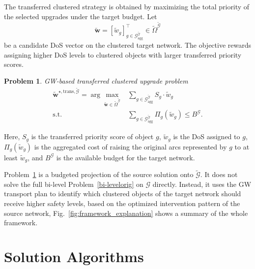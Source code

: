 \documentclass[lettersize,journal]{IEEEtran}
\newtheorem{problem}{Problem}
\begin{document}
The transferred clustered strategy is obtained by maximizing the total priority
of the selected upgrades under the target budget. Let
\[
\tilde{\mathbf{w}}
=
\left[
\tilde{w}_g
\right]_{g\in\mathcal{G}_{\mathrm{agg}}^{\tilde{\mathcal{G}}}}^{\top}
\in
\tilde{\Omega}^{\tilde{\mathcal{G}}}
\]
be a candidate DoS vector on the clustered target network. The objective rewards
assigning higher DoS levels to clustered objects with larger transferred
priority scores.

\begin{problem}{GW-based transferred clustered upgrade problem}
\label{prob:gw_transfer_clustered}
\begin{align}
\tilde{\mathbf{w}}^{\star,\mathrm{trans},\tilde{\mathcal{G}}}
=
\arg\max_{\tilde{\mathbf{w}}\in\tilde{\Omega}^{\tilde{\mathcal{G}}}}
&
\sum_{g\in\mathcal{G}_{\mathrm{agg}}^{\tilde{\mathcal{G}}}}
S_g
\cdot
\tilde{w}_g
\label{eq:transfer_projection_clustered}
\\
\mathrm{s.t.}\quad
&
\sum_{g\in\mathcal{G}_{\mathrm{agg}}^{\tilde{\mathcal{G}}}}
\Pi_g(\tilde{w}_g)
\leq
B^{\mathcal{G}}.
\label{eq:transfer_projection_budget_clustered}
\end{align}
\end{problem}

Here, $S_g$ is the transferred priority score of object $g$,
$\tilde{w}_g$ is the DoS assigned to $g$, $\Pi_g(\tilde{w}_g)$ is the aggregated cost
of raising the original arcs represented by $g$ to at least $\tilde{w}_g$, and
$B^{\mathcal{G}}$ is the available budget for the target network.

Problem~\ref{prob:gw_transfer_clustered} is a budgeted projection of the source
solution onto $\tilde{\mathcal{G}}$. It does not solve the full bi-level
Problem~\ref{bi-levelorig} on $\mathcal{G}$ directly. Instead, it uses the GW
transport plan to identify which clustered objects of the target network should
receive higher safety levels, based on the optimized intervention pattern of the
source network, Fig.~\ref{fig:framework_explanation} shows a summary of the whole framework.

\section{Solution Algorithms}
\label{sec:solution_algorithms}
\end{document}
